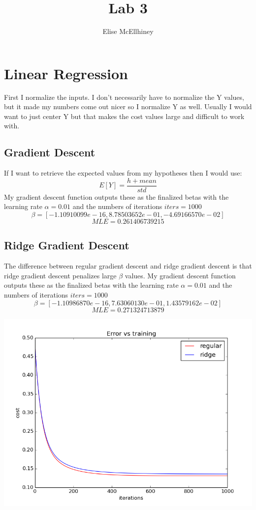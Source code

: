 \documentclass[11pt]{amsart}
\title{Lab 3}
\author{Elise McEllhiney}
\begin{document}
\maketitle

\section{Linear Regression}
First I normalize the inputs.  I don't necessarily have to normalize the Y values, but it made my numbers come out nicer so I normalize Y as well.  Usually I would want to just center Y but that makes the cost values large and difficult to work with.
\subsection{Gradient Descent}
If I want to retrieve the expected values from my hypotheses then I would use: $$E[Y] = \frac{h + mean}{std}$$
My gradient descent function outputs these as the finalized betas with the learning rate $\alpha = 0.01$ and the numbers of iterations $iters = 1000$
$$\beta = [ -1.10910099e-16,   8.78503652e-01,  -4.69166570e-02]$$
$$MLE=0.261406739215$$

\subsection{Ridge Gradient Descent}
The difference between regular gradient descent and ridge gradient descent is that ridge gradient descent penalizes large $\beta$ values.
My gradient descent function outputs these as the finalized betas with the learning rate $\alpha = 0.01$ and the numbers of iterations $iters = 1000$
$$\beta = [ -1.10986870e-16,   7.63060130e-01,   1.43579162e-02]$$
$$MLE = 0.271324713879$$
\begin{center}
\includegraphics[scale=.75]{figure_1.png}
\end{center}
\end{document}
